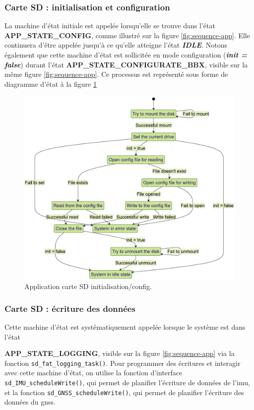 \subsubsection{Carte SD : initialisation et configuration}

La machine d'état initiale est appelée lorsqu'elle se trouve dans l'état \textbf{APP\_STATE\_CONFIG}, comme illustré sur la figure \ref{fig:sequence-app}. Elle continuera d'être appelée jusqu'à ce qu'elle atteigne l'état \textbf{\textit{IDLE}}. Notons également que cette machine d'état est sollicitée en mode configuration (\textbf{\textit{init = false}}) durant l'état \textbf{APP\_STATE\_CONFIGURATE\_BBX}, visible sur la même figure \ref{fig:sequence-app}. Ce processus est représenté sous forme de diagramme d'état à la figure \ref{fig:sd-card-init}



\begin{figure}[h]
	\centering
	\includegraphics[width=1\linewidth]{../figures/code/diagrammes/sd-card-Init}
	\caption{Application carte SD initialisation/config.}
	\label{fig:sd-card-init}
\end{figure}

\clearpage

\subsubsection{Carte SD : écriture des données}
Cette machine d'état est systématiquement appelée lorsque le système est dans l'état 
\noindent

\textbf{APP\_STATE\_LOGGING}, visible sur la figure \ref{fig:sequence-app} via la fonction \verb*|sd_fat_logging_task()|. Pour programmer des écritures et interagir avec cette machine d'état, on utilise la fonction d'interface \verb*|sd_IMU_scheduleWrite()|, qui permet de planifier l'écriture de données de l'\gls{imu}, et la fonction \verb*|sd_GNSS_scheduleWrite()|, qui permet de planifier l'écriture des données du \gls{gnss}.


